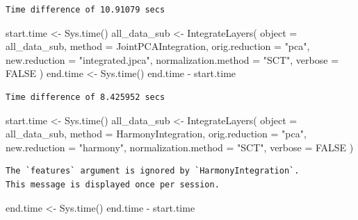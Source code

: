 \documentclass[
  letterpaper,
  DIV=11,
  numbers=noendperiod]{scrreprt}
\newenvironment{Shaded}{\begin{snugshade}}{\end{snugshade}}
\newcommand{\AttributeTok}[1]{\textcolor[rgb]{0.40,0.45,0.13}{#1}}
\newcommand{\ConstantTok}[1]{\textcolor[rgb]{0.56,0.35,0.01}{#1}}
\newcommand{\FunctionTok}[1]{\textcolor[rgb]{0.28,0.35,0.67}{#1}}
\newcommand{\NormalTok}[1]{\textcolor[rgb]{0.00,0.23,0.31}{#1}}
\newcommand{\OtherTok}[1]{\textcolor[rgb]{0.00,0.23,0.31}{#1}}
\newcommand{\SpecialCharTok}[1]{\textcolor[rgb]{0.37,0.37,0.37}{#1}}
\newcommand{\StringTok}[1]{\textcolor[rgb]{0.13,0.47,0.30}{#1}}
\begin{document}
\begin{verbatim}
Time difference of 10.91079 secs
\end{verbatim}

\begin{Shaded}
\begin{Highlighting}[]
\NormalTok{start.time }\OtherTok{\textless{}{-}} \FunctionTok{Sys.time}\NormalTok{()}
\NormalTok{all\_data\_sub }\OtherTok{\textless{}{-}} \FunctionTok{IntegrateLayers}\NormalTok{(}
  \AttributeTok{object =}\NormalTok{ all\_data\_sub, }\AttributeTok{method =}\NormalTok{ JointPCAIntegration,}
  \AttributeTok{orig.reduction =} \StringTok{"pca"}\NormalTok{, }\AttributeTok{new.reduction =} \StringTok{"integrated.jpca"}\NormalTok{, }\AttributeTok{normalization.method =} \StringTok{"SCT"}\NormalTok{,}
  \AttributeTok{verbose =} \ConstantTok{FALSE}
\NormalTok{)}
\NormalTok{end.time }\OtherTok{\textless{}{-}} \FunctionTok{Sys.time}\NormalTok{()}
\NormalTok{end.time }\SpecialCharTok{{-}}\NormalTok{ start.time}
\end{Highlighting}
\end{Shaded}

\begin{verbatim}
Time difference of 8.425952 secs
\end{verbatim}

\begin{Shaded}
\begin{Highlighting}[]
\NormalTok{start.time }\OtherTok{\textless{}{-}} \FunctionTok{Sys.time}\NormalTok{()}
\NormalTok{all\_data\_sub }\OtherTok{\textless{}{-}} \FunctionTok{IntegrateLayers}\NormalTok{(}
  \AttributeTok{object =}\NormalTok{ all\_data\_sub, }\AttributeTok{method =}\NormalTok{ HarmonyIntegration,}
  \AttributeTok{orig.reduction =} \StringTok{"pca"}\NormalTok{, }\AttributeTok{new.reduction =} \StringTok{"harmony"}\NormalTok{, }\AttributeTok{normalization.method =} \StringTok{"SCT"}\NormalTok{,}
  \AttributeTok{verbose =} \ConstantTok{FALSE}
\NormalTok{)}
\end{Highlighting}
\end{Shaded}

\begin{verbatim}
The `features` argument is ignored by `HarmonyIntegration`.
This message is displayed once per session.
\end{verbatim}

\begin{Shaded}
\begin{Highlighting}[]
\NormalTok{end.time }\OtherTok{\textless{}{-}} \FunctionTok{Sys.time}\NormalTok{()}
\NormalTok{end.time }\SpecialCharTok{{-}}\NormalTok{ start.time}
\end{Highlighting}
\end{Shaded}
\end{document}

